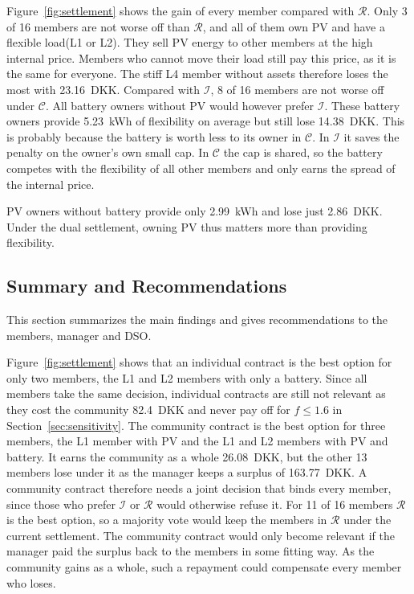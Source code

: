 Figure~\ref{fig:settlement} shows the gain of every member compared with $\mathcal{R}$.
Only 3 of 16 members are not worse off than $\mathcal{R}$, and all of them own PV and have a flexible load(L1 or L2).
They sell PV energy to other members at the high internal price.
Members who cannot move their load still pay this price, as it is the same for everyone.
The stiff L4 member without assets therefore loses the most with 23.16~DKK.
Compared with $\mathcal{I}$, 8 of 16 members are not worse off under $\mathcal{C}$. All battery owners without PV would however prefer $\mathcal{I}$. These battery owners provide 5.23~kWh of flexibility on average but still lose 14.38~DKK. This is probably because the battery is worth less to its owner in $\mathcal{C}$. In $\mathcal{I}$ it saves the penalty on the owner's own small cap.
In $\mathcal{C}$ the cap is shared, so the battery competes with the flexibility of all other members and only earns the spread of the internal price.

PV owners without battery provide only 2.99~kWh and lose just 2.86~DKK.
Under the dual settlement, owning PV thus matters more than providing flexibility.

\subsection{Summary and Recommendations}
This section summarizes the main findings and gives recommendations to the members, manager and DSO.

Figure~\ref{fig:settlement} shows that an individual contract is the best option for only two members, the L1 and L2 members with only a battery. Since all members take the same decision, individual contracts are still not relevant as they cost the community 82.4~DKK and never pay off for $f\leq 1.6$ in Section~\ref{sec:sensitivity}. The community contract is the best option for three members, the L1 member with PV and the L1 and L2 members with PV and battery. It earns the community as a whole 26.08~DKK, but the other 13 members lose under it as the manager keeps a surplus of 163.77~DKK. A community contract therefore needs a joint decision that binds every member, since those who prefer $\mathcal{I}$ or $\mathcal{R}$ would otherwise refuse it. For 11 of 16 members $\mathcal{R}$ is the best option, so a majority vote would keep the members in $\mathcal{R}$ under the current settlement. The community contract would only become relevant if the manager paid the surplus back to the members in some fitting way. As the community gains as a whole, such a repayment could compensate every member who loses. 

